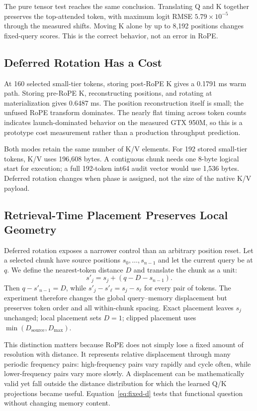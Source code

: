 \documentclass[11pt]{article}
\begin{document}
The pure tensor test reaches the same conclusion. Translating Q and K together preserves the
top-attended token, with maximum logit RMSE $5.79\times10^{-5}$ through the measured shifts.
Moving K alone by up to 8,192 positions changes fixed-query scores. This is the correct
behavior, not an error in RoPE.

\subsection{Deferred Rotation Has a Cost}

At 160 selected small-tier tokens, storing post-RoPE K gives a 0.1791 ms warm path. Storing
pre-RoPE K, reconstructing positions, and rotating at materialization gives 0.6487 ms. The
position reconstruction itself is small; the unfused RoPE transform dominates. The nearly
flat timing across token counts indicates launch-dominated behavior on the measured GTX 950M,
so this is a prototype cost measurement rather than a production throughput prediction.

Both modes retain the same number of K/V elements. For 192 stored small-tier tokens, K/V uses
196,608 bytes. A contiguous chunk needs one 8-byte logical start for execution; a full
192-token int64 audit vector would use 1,536 bytes. Deferred rotation changes when phase is
assigned, not the size of the native K/V payload.

\subsection{Retrieval-Time Placement Preserves Local Geometry}
\label{sec:retrieval-placement}

Deferred rotation exposes a narrower control than an arbitrary position reset. Let a
selected chunk have source positions $s_0,\ldots,s_{n-1}$ and let the current query be at
$q$. We define the nearest-token distance $D$ and translate the chunk as a unit:
\begin{equation}
  s'_j=s_j+\left(q-D-s_{n-1}\right).
  \label{eq:fixed-d}
\end{equation}
Then $q-s'_{n-1}=D$, while
$s'_j-s'_\ell=s_j-s_\ell$ for every pair of tokens. The experiment therefore changes the
global query--memory displacement but preserves token order and all within-chunk spacing.
Exact placement leaves $s_j$ unchanged; local placement sets $D=1$; clipped placement uses
$\min(D_{\mathrm{source}},D_{\max})$.

This distinction matters because RoPE does not simply lose a fixed amount of resolution with
distance. It represents relative displacement through many periodic frequency pairs:
high-frequency pairs vary rapidly and cycle often, while lower-frequency pairs vary more
slowly. A displacement can be mathematically valid yet fall outside the distance distribution
for which the learned Q/K projections became useful. Equation~\ref{eq:fixed-d} tests that
functional question without changing memory content.
\end{document}
